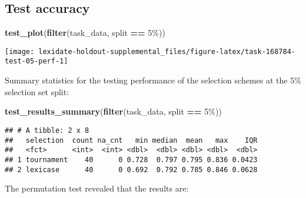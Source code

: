 \documentclass[
]{book}
\newenvironment{Shaded}{\begin{snugshade}}{\end{snugshade}}
\newcommand{\AttributeTok}[1]{\textcolor[rgb]{0.13,0.29,0.53}{#1}}
\newcommand{\DecValTok}[1]{\textcolor[rgb]{0.00,0.00,0.81}{#1}}
\newcommand{\FunctionTok}[1]{\textcolor[rgb]{0.13,0.29,0.53}{\textbf{#1}}}
\newcommand{\NormalTok}[1]{#1}
\newcommand{\OtherTok}[1]{\textcolor[rgb]{0.56,0.35,0.01}{#1}}
\newcommand{\SpecialCharTok}[1]{\textcolor[rgb]{0.81,0.36,0.00}{\textbf{#1}}}
\newcommand{\StringTok}[1]{\textcolor[rgb]{0.31,0.60,0.02}{#1}}
\begin{document}
\hypertarget{test-accuracy-50}{%
\subsection{Test accuracy}\label{test-accuracy-50}}

\begin{Shaded}
\begin{Highlighting}[]
\FunctionTok{test\_plot}\NormalTok{(}\FunctionTok{filter}\NormalTok{(task\_data, split }\SpecialCharTok{==} \StringTok{\textquotesingle{}5\%\textquotesingle{}}\NormalTok{))}
\end{Highlighting}
\end{Shaded}

\texttt{[image: lexidate-holdout-supplemental\_files/figure-latex/task-168784-test-05-perf-1]}

Summary statistics for the testing performance of the selection schemes at the 5\% selection set split:

\begin{Shaded}
\begin{Highlighting}[]
\FunctionTok{test\_results\_summary}\NormalTok{(}\FunctionTok{filter}\NormalTok{(task\_data, split }\SpecialCharTok{==} \StringTok{\textquotesingle{}5\%\textquotesingle{}}\NormalTok{))}
\end{Highlighting}
\end{Shaded}

\begin{verbatim}
## # A tibble: 2 x 8
##   selection  count na_cnt   min median  mean   max    IQR
##   <fct>      <int>  <int> <dbl>  <dbl> <dbl> <dbl>  <dbl>
## 1 tournament    40      0 0.728  0.797 0.795 0.836 0.0423
## 2 lexicase      40      0 0.692  0.792 0.785 0.846 0.0628
\end{verbatim}

The permutation test revealed that the results are:

\begin{Shaded}
\end{Shaded}
\end{document}
